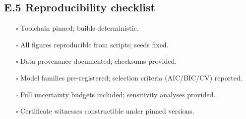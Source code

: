 \documentclass[12pt,a4paper]{article}
\begin{document}
\subsection*{E.5 Reproducibility checklist}
\begin{itemize}
  \item[\(\square\)] Toolchain pinned; builds deterministic.
  \item[\(\square\)] All figures reproducible from scripts; seeds fixed.
  \item[\(\square\)] Data provenance documented; checksums provided.
  \item[\(\square\)] Model families pre-registered; selection criteria (AIC/BIC/CV) reported.
  \item[\(\square\)] Full uncertainty budgets included; sensitivity analyses provided.
  \item[\(\square\)] Certificate witnesses constructible under pinned versions.
\end{itemize}
\end{document}
